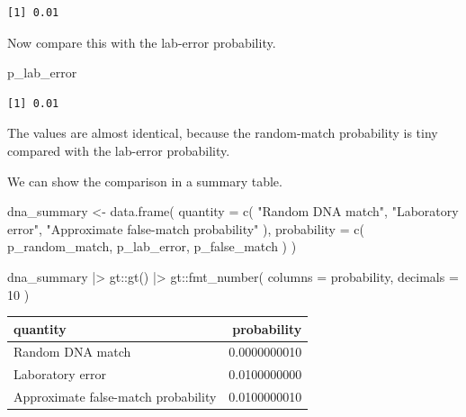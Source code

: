 \documentclass[
  letterpaper,
  DIV=11,
  numbers=noendperiod]{scrreprt}
\newenvironment{Shaded}{\begin{snugshade}}{\end{snugshade}}
\newcommand{\AttributeTok}[1]{\textcolor[rgb]{0.40,0.45,0.13}{#1}}
\newcommand{\DecValTok}[1]{\textcolor[rgb]{0.68,0.00,0.00}{#1}}
\newcommand{\FunctionTok}[1]{\textcolor[rgb]{0.28,0.35,0.67}{#1}}
\newcommand{\NormalTok}[1]{\textcolor[rgb]{0.00,0.23,0.31}{#1}}
\newcommand{\OtherTok}[1]{\textcolor[rgb]{0.00,0.23,0.31}{#1}}
\newcommand{\SpecialCharTok}[1]{\textcolor[rgb]{0.37,0.37,0.37}{#1}}
\newcommand{\StringTok}[1]{\textcolor[rgb]{0.13,0.47,0.30}{#1}}
\begin{document}
\begin{verbatim}
[1] 0.01
\end{verbatim}

Now compare this with the lab-error probability.

\begin{Shaded}
\begin{Highlighting}[]
\NormalTok{p\_lab\_error}
\end{Highlighting}
\end{Shaded}

\begin{verbatim}
[1] 0.01
\end{verbatim}

The values are almost identical, because the random-match probability is
tiny compared with the lab-error probability.

We can show the comparison in a summary table.

\begin{Shaded}
\begin{Highlighting}[]
\NormalTok{dna\_summary }\OtherTok{\textless{}{-}} \FunctionTok{data.frame}\NormalTok{(}
  \AttributeTok{quantity =} \FunctionTok{c}\NormalTok{(}
    \StringTok{"Random DNA match"}\NormalTok{,}
    \StringTok{"Laboratory error"}\NormalTok{,}
    \StringTok{"Approximate false{-}match probability"}
\NormalTok{  ),}
  \AttributeTok{probability =} \FunctionTok{c}\NormalTok{(}
\NormalTok{    p\_random\_match,}
\NormalTok{    p\_lab\_error,}
\NormalTok{    p\_false\_match}
\NormalTok{  )}
\NormalTok{)}

\NormalTok{dna\_summary }\SpecialCharTok{|\textgreater{}}
\NormalTok{  gt}\SpecialCharTok{::}\FunctionTok{gt}\NormalTok{() }\SpecialCharTok{|\textgreater{}}
\NormalTok{  gt}\SpecialCharTok{::}\FunctionTok{fmt\_number}\NormalTok{(}
    \AttributeTok{columns =}\NormalTok{ probability,}
    \AttributeTok{decimals =} \DecValTok{10}
\NormalTok{  )}
\end{Highlighting}
\end{Shaded}

\begin{table}
\fontsize{12.0pt}{14.0pt}\selectfont
\begin{tabular*}{\linewidth}{@{\extracolsep{\fill}}lr}
\toprule
quantity & probability \\ 
\midrule\addlinespace[2.5pt]
Random DNA match & 0.0000000010 \\ 
Laboratory error & 0.0100000000 \\ 
Approximate false-match probability & 0.0100000010 \\ 
\bottomrule
\end{tabular*}
\end{table}
\end{document}
